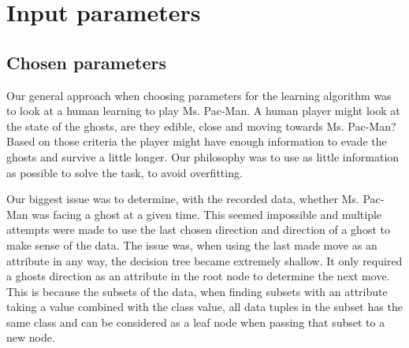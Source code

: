 \documentclass{article}
\begin{document}
\fi %
\section{Input parameters}
%

    \subsection{Chosen parameters}
    Our general approach when choosing parameters for the learning algorithm was to look at a human learning to play Ms. Pac-Man. A human player might look at the state of the ghosts, are they edible, close and moving towards Ms. Pac-Man? Based on those criteria the player might have enough information to evade the ghosts and survive a little longer. Our philosophy was to use as little information as possible to solve the task, to avoid overfitting.

    Our biggest issue was to determine, with the recorded data, whether Ms. Pac-Man was facing a ghost at a given time. This seemed impossible and multiple attempts were made to use the last chosen direction and direction of a ghost to make sense of the data. The issue was, when using the last made move as an attribute in any way, the decision tree became extremely shallow. It only required a ghosts direction as an attribute in the root node to determine the next move. This is because the subsets of the data, when finding subsets with an attribute taking a value combined with the class value, all data tuples in the subset has the same class and can be considered as a leaf node when passing that subset to a new node.
\end{document}
